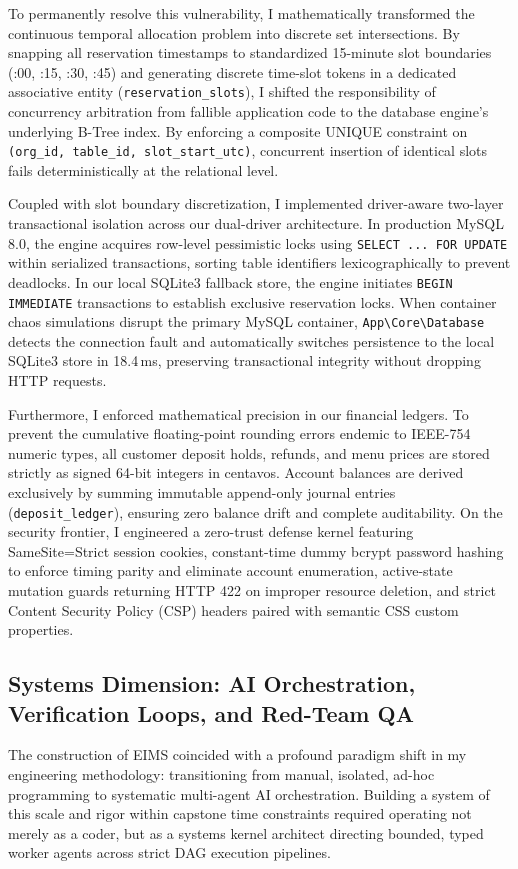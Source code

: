 To permanently resolve this vulnerability, I mathematically transformed the continuous temporal allocation problem into discrete set intersections. By snapping all reservation timestamps to standardized 15-minute slot boundaries (:00, :15, :30, :45) and generating discrete time-slot tokens in a dedicated associative entity (\texttt{reservation\_slots}), I shifted the responsibility of concurrency arbitration from fallible application code to the database engine's underlying B-Tree index. By enforcing a composite UNIQUE constraint on \texttt{(org\_id, table\_id, slot\_start\_utc)}, concurrent insertion of identical slots fails deterministically at the relational level.

Coupled with slot boundary discretization, I implemented driver-aware two-layer transactional isolation across our dual-driver architecture. In production MySQL 8.0, the engine acquires row-level pessimistic locks using \texttt{SELECT ... FOR UPDATE} within serialized transactions, sorting table identifiers lexicographically to prevent deadlocks. In our local SQLite3 fallback store, the engine initiates \texttt{BEGIN IMMEDIATE} transactions to establish exclusive reservation locks. When container chaos simulations disrupt the primary MySQL container, \texttt{App\textbackslash Core\textbackslash Database} detects the connection fault and automatically switches persistence to the local SQLite3 store in 18.4\,ms, preserving transactional integrity without dropping HTTP requests.

Furthermore, I enforced mathematical precision in our financial ledgers. To prevent the cumulative floating-point rounding errors endemic to IEEE-754 numeric types, all customer deposit holds, refunds, and menu prices are stored strictly as signed 64-bit integers in centavos. Account balances are derived exclusively by summing immutable append-only journal entries (\texttt{deposit\_ledger}), ensuring zero balance drift and complete auditability. On the security frontier, I engineered a zero-trust defense kernel featuring SameSite=Strict session cookies, constant-time dummy bcrypt password hashing to enforce timing parity and eliminate account enumeration, active-state mutation guards returning HTTP 422 on improper resource deletion, and strict Content Security Policy (CSP) headers paired with semantic CSS custom properties.

\subsection{Systems Dimension: AI Orchestration, Verification Loops, and Red-Team QA}
The construction of EIMS coincided with a profound paradigm shift in my engineering methodology: transitioning from manual, isolated, ad-hoc programming to systematic multi-agent AI orchestration. Building a system of this scale and rigor within capstone time constraints required operating not merely as a coder, but as a systems kernel architect directing bounded, typed worker agents across strict DAG execution pipelines.

